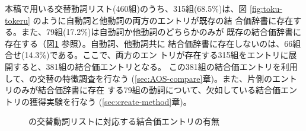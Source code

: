 \documentclass[japanese]{jnlp}
\newcommand{\soalt}{}
\begin{document}
本稿で用いる交替動詞リスト(460組)のうち、315組(68.5\%)は、図
\ref{fig:toku-tokeru} のように自動詞と他動詞の両方のエントリが既存の結
合価辞書に存在する。また、79組(17.2\%)は自動詞か他動詞のどちらかのみが
既存の結合価辞書に存在する（図\ref{fig:venn} 参照）。自動詞、他動詞共に
結合価辞書に存在しないのは、66組合せ(14.3\%)である。ここで、両方のエン
トリが存在する315組をエントリに展開すると、381組の結合価エントリとなる。
この381組の結合価エントリを利用して、\soalt の交替の特徴調査を行なう
(\ref{sec:AOS-compare}章)。また、片側のエントリのみが結合価辞書に存在
する79組の動詞について、欠如している結合価エントリの獲得実験を行なう
(\ref{sec:create-method}章)。

\begin{figure}[htbp]
  \centering
  \caption{\soalt の交替動詞リストに対応する結合価エントリの有無}
  \label{fig:venn}
\end{figure}
\end{document}
